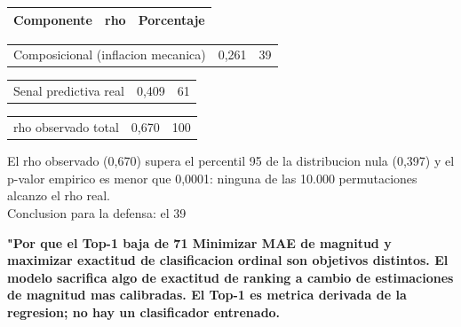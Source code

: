 \documentclass[11pt,a4paper]{article}
\begin{document}
{{\begin{center}
\begin{tabular}{lll}
\hline
Componente & rho & Porcentaje \\
\hline
\end{tabular}
\end{center}
\begin{center}
\begin{tabular}{lll}
\hline
Composicional (inflacion mecanica) & 0,261 & 39%
\hline
\end{tabular}
\end{center}
\begin{center}
\begin{tabular}{lll}
\hline
Senal predictiva real & 0,409 & 61%
\hline
\end{tabular}
\end{center}
\begin{center}
\begin{tabular}{lll}
\hline
rho observado total & 0,670 & 100%
\hline
\end{tabular}
\end{center}

El rho observado (0,670) supera el percentil 95 de la distribucion nula (0,397) y el p-valor empirico es menor que 0,0001: ninguna de las 10.000 permutaciones alcanzo el rho real.\\[2pt]

Conclusion para la defensa: el 39%

\textbf{"Por que el Top-1 baja de 71%
Minimizar MAE de magnitud y maximizar exactitud de clasificacion ordinal son objetivos distintos. El modelo sacrifica algo de exactitud de ranking a cambio de estimaciones de magnitud mas calibradas. El Top-1 es metrica derivada de la regresion; no hay un clasificador entrenado.\\[2pt]

}}}
\end{document}
